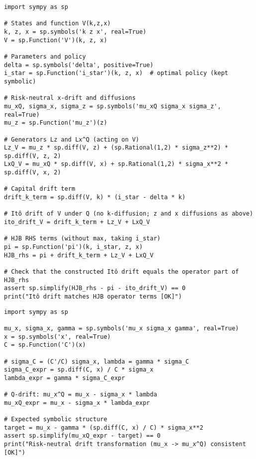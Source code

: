 \documentclass[11pt,letterpaper,oneside]{article}
\begin{document}
\begin{tcolorbox}[sympycheckstyle,title={Itô drift equals HJB operator under $\mathbb{Q}$}]
\begin{verbatim}
import sympy as sp

# States and function V(k,z,x)
k, z, x = sp.symbols('k z x', real=True)
V = sp.Function('V')(k, z, x)

# Parameters and policy
delta = sp.symbols('delta', positive=True)
i_star = sp.Function('i_star')(k, z, x)  # optimal policy (kept symbolic)

# Risk-neutral x-drift and diffusions
mu_xQ, sigma_x, sigma_z = sp.symbols('mu_xQ sigma_x sigma_z', real=True)
mu_z = sp.Function('mu_z')(z)

# Generators Lz and Lx^Q (acting on V)
Lz_V = mu_z * sp.diff(V, z) + (sp.Rational(1,2) * sigma_z**2) * sp.diff(V, z, 2)
LxQ_V = mu_xQ * sp.diff(V, x) + sp.Rational(1,2) * sigma_x**2 * sp.diff(V, x, 2)

# Capital drift term
drift_k_term = sp.diff(V, k) * (i_star - delta * k)

# Itô drift of V under Q (no k-diffusion; z and x diffusions as above)
ito_drift_V = drift_k_term + Lz_V + LxQ_V

# HJB RHS terms (without max, taking i_star)
pi = sp.Function('pi')(k, i_star, z, x)
HJB_rhs = pi + drift_k_term + Lz_V + LxQ_V

# Check that the constructed Itô drift equals the operator part of HJB_rhs
assert sp.simplify(HJB_rhs - pi - ito_drift_V) == 0
print("Itô drift matches HJB operator terms [OK]")
\end{verbatim}
\end{tcolorbox}

\begin{tcolorbox}[sympycheckstyle,title={Risk-neutral drift transformation consistency}]
\begin{verbatim}
import sympy as sp

mu_x, sigma_x, gamma = sp.symbols('mu_x sigma_x gamma', real=True)
x = sp.symbols('x', real=True)
C = sp.Function('C')(x)

# sigma_C = (C'/C) sigma_x, lambda = gamma * sigma_C
sigma_C_expr = sp.diff(C, x) / C * sigma_x
lambda_expr = gamma * sigma_C_expr

# Q-drift: mu_x^Q = mu_x - sigma_x * lambda
mu_xQ_expr = mu_x - sigma_x * lambda_expr

# Expected symbolic structure
target = mu_x - gamma * (sp.diff(C, x) / C) * sigma_x**2
assert sp.simplify(mu_xQ_expr - target) == 0
print("Risk-neutral drift transformation (mu_x -> mu_x^Q) consistent [OK]")
\end{verbatim}
\end{tcolorbox}
\end{document}
